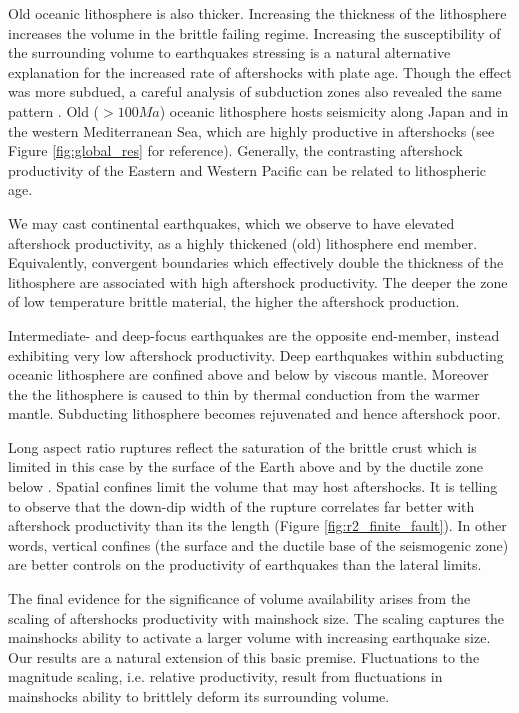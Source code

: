 \documentclass[draft, jgrga]{agujournal2018}
\begin{document}
Old oceanic lithosphere is also thicker. Increasing the thickness of the lithosphere increases the volume in the brittle failing regime. Increasing the susceptibility of the surrounding volume to earthquakes stressing is a natural alternative explanation for the increased rate of aftershocks with plate age. Though the effect was more subdued, a careful analysis of subduction zones also revealed the same pattern \citep[Appendix of][]{Wetzler2016}. Old ($>100Ma$) oceanic lithosphere hosts seismicity along Japan and in the western Mediterranean Sea, which are highly productive in aftershocks (see Figure \ref{fig:global_res} for reference). Generally, the contrasting aftershock productivity of the Eastern and Western Pacific can be related to lithospheric age. 

We may cast continental earthquakes, which we observe to have elevated aftershock productivity, as a highly thickened (old) lithosphere end member. Equivalently, convergent boundaries which effectively double the thickness of the lithosphere are associated with high aftershock productivity. The deeper the zone of low temperature brittle material, the higher the aftershock production.

Intermediate- and deep-focus earthquakes are the opposite end-member, instead exhibiting very low aftershock productivity. Deep earthquakes within subducting oceanic lithosphere are confined above and below by viscous mantle. Moreover the the lithosphere is caused to thin by thermal conduction from the warmer mantle. Subducting lithosphere becomes rejuvenated and hence aftershock poor.

Long aspect ratio ruptures reflect the saturation of the brittle crust which is limited in this case by the surface of the Earth above and by the ductile zone below \citep{Scholz2019}. Spatial confines limit the volume that may host aftershocks. It is telling to observe that the down-dip width of the rupture correlates far better with aftershock productivity than its the length (Figure \ref{fig:r2_finite_fault}). In other words, vertical confines (the surface and the ductile base of the seismogenic zone) are better controls on the productivity of earthquakes than the lateral limits. 

The final evidence for the significance of volume availability arises from the scaling of aftershocks productivity with mainshock size. The scaling captures the mainshocks ability to activate a larger volume with increasing earthquake size. Our results are a natural extension of this basic premise. Fluctuations to the magnitude scaling, i.e. relative productivity, result from fluctuations in mainshocks ability to brittlely deform its surrounding volume. 
\end{document}
